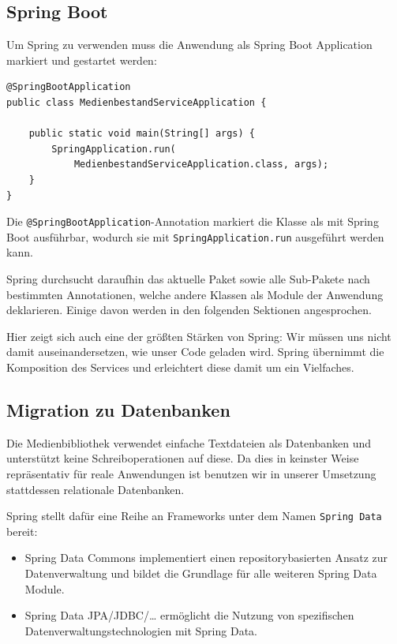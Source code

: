 \documentclass{article}
\begin{document}
\subsection{Spring Boot}

Um Spring zu verwenden muss die Anwendung als Spring Boot Application markiert und gestartet werden:

\begin{lstlisting}
@SpringBootApplication
public class MedienbestandServiceApplication {

    public static void main(String[] args) {
        SpringApplication.run(
        	MedienbestandServiceApplication.class, args);
    }
}
\end{lstlisting}

Die \texttt{@SpringBootApplication}-Annotation markiert die Klasse als mit Spring Boot ausführbar, wodurch sie mit \texttt{SpringApplication.run} ausgeführt werden kann.

Spring durchsucht daraufhin das aktuelle Paket sowie alle Sub-Pakete nach bestimmten Annotationen, welche andere Klassen als Module der Anwendung deklarieren.
Einige davon werden in den folgenden Sektionen angesprochen.

Hier zeigt sich auch eine der größten Stärken von Spring: Wir müssen uns nicht damit auseinandersetzen, wie unser Code geladen wird.
Spring übernimmt die Komposition des Services und erleichtert diese damit um ein Vielfaches.

\subsection{Migration zu Datenbanken}

Die Medienbibliothek verwendet einfache Textdateien als Datenbanken und unterstützt keine Schreiboperationen auf diese.
Da dies in keinster Weise repräsentativ für reale Anwendungen ist benutzen wir in unserer Umsetzung stattdessen relationale Datenbanken.

Spring stellt dafür eine Reihe an Frameworks unter dem Namen \texttt{Spring Data} bereit:
\begin{itemize}
        \item{Spring Data Commons} {implementiert einen repositorybasierten Ansatz zur Datenverwaltung und bildet die Grundlage für alle weiteren Spring Data Module.}
        \item{Spring Data JPA/JDBC/\ldots} ermöglicht die Nutzung von spezifischen Datenverwaltungstechnologien mit Spring Data.
\end{itemize}
\end{document}

